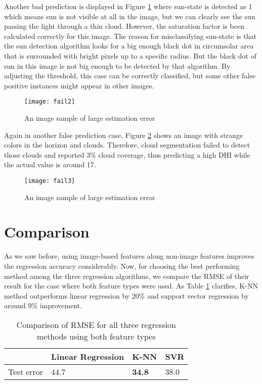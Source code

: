 Another bad prediction is displayed in Figure \ref{fig:img_fail2} where sun-state is detected as 1 which means sun is not visible at all in the image, but we can clearly see the sun passing the light through a thin cloud. However, the saturation factor is been calculated correctly for this image. The reason for misclassifying sun-state is that the sun detection algorithm looks for a big enough black dot in circumsolar area that is surrounded with bright pixels up to a specific radius. But the black dot of sun in this image is not big enough to be detected by that algorithm. By adjusting the threshold, this case can be correctly classified, but some other false positive instances might appear in other images.

\begin{figure}[h!]
\caption{An image sample of large estimation error}
\label{fig:img_fail2}
\texttt{[image: fail2]}
\centering
\end{figure}

Again in another false prediction case, Figure \ref{fig:img_fail3} shows an image with strange colors in the horizon and clouds. Therefore, cloud segmentation failed to detect those clouds and reported 3\% cloud coverage, thus predicting a high DHI while the actual value is around 17.

\begin{figure}[h!]
\caption{An image sample of large estimation error}
\label{fig:img_fail3}
\texttt{[image: fail3]}
\centering
\end{figure}

\section{Comparison}
As we saw before, using image-based features along non-image features improves the regression accuracy considerably. Now, for choosing the best performing method among the three regression algorithms, we compare the RMSE of their result for the case where both feature types were used. As Table \ref{table:rmse_cmp} clarifies, K-NN method outperforms linear regression by 20\% and support vector regression by around 9\% improvement.

\begin{table}[h!]
\centering
\begin{tabular}{ |p{2cm}||p{4cm}|p{2cm}|p{2cm}|  }
\hline
 &Linear Regression& K-NN & SVR\\
 \hline
Test error& 44.7 & \textbf{34.8} & 38.0\\
 \hline
\end{tabular}
\caption{Comparison of RMSE for all three regression methods using both feature types}
\label{table:rmse_cmp}
\end{table}

